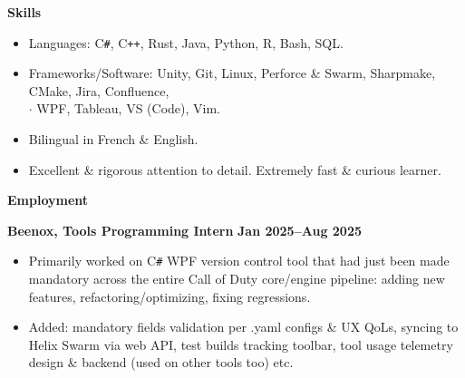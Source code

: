 \documentclass[11pt, oneside]{article}   	%
\begin{document}
\vspace{6pt}

\textbf{\large{Skills}}
\small \vspace{-4pt}
\begin{itemize}
\item Languages: C\texttt{\#}, C\texttt{++}, Rust, Java, Python, R, Bash, SQL.
\vspace{-4pt}
\item Frameworks/Software: Unity, Git, Linux, Perforce \& Swarm, Sharpmake, CMake, Jira, Confluence, \\ 
    \textcolor{charcoal}{$\cdot$} \hspace{92pt} WPF, Tableau, VS (Code), Vim.
\vspace{-4pt}
\item Bilingual in French \& English.
\vspace{-4pt}
\item Excellent \& rigorous attention to detail. Extremely fast \& curious learner.
\end{itemize}

\vspace{12pt}

\textbf{\large{Employment}}
\small 

\vspace{6pt}

\textbf{Beenox, Tools Programming Intern} \hfill \textbf{Jan 2025--Aug 2025}
\vspace{-4pt}
\begin{itemize}
\item Primarily worked on C\texttt{\#} WPF version control tool that had just been made mandatory across the entire Call of Duty core/engine pipeline: adding new features, refactoring/optimizing, fixing regressions.
\vspace{-4pt}
\item Added: mandatory fields validation per .yaml configs \& UX QoLs, syncing to Helix Swarm via web API, test builds tracking toolbar, tool usage telemetry design \& backend (used on other tools too) etc.
\end{itemize}

\vspace{4pt}
\end{document}
